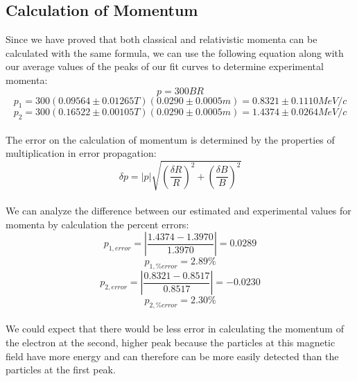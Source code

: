 \subsection{Calculation of Momentum}
Since we have proved that both classical and relativistic momenta can be calculated with the same formula, we can use the following equation along with our average values of the peaks of our fit curves to determine experimental momenta:
\begin{equation} p=300BR\end{equation}
\begin{equation} p_1=300(0.09564\pm0.01265 T)(0.0290\pm 0.0005m)=0.8321\pm0.1110 MeV/c\end{equation}
\begin{equation} p_2=300(0.16522\pm0.00105 T)(0.0290\pm 0.0005m)=1.4374\pm0.0264 MeV/c\end{equation}\\
The error on the calculation of momentum is determined by the properties of multiplication in error propagation:
\begin{equation} \delta p= |p|\sqrt{(\frac{\delta R}{R})^2 + (\frac{\delta B}{B})^2}\end{equation}\\
We can analyze the difference between our estimated and experimental values for momenta by calculation the percent errors: 
\begin{equation} p_{1,error}=|\frac{1.4374-1.3970}{1.3970}|=0.0289\end{equation}
\begin{equation} p_{1,\% error}= 2.89 \% \end{equation}
\begin{equation} p_{2,error}=|\frac{0.8321-0.8517}{0.8517}|=-0.0230\end{equation}
\begin{equation} p_{2,\% error}= 2.30 \% \end{equation}\\
We could expect that there would be less error in calculating the momentum of the electron at the second, higher peak because the particles at this magnetic field have more energy and can therefore can be more easily detected than the particles at the first peak. 

